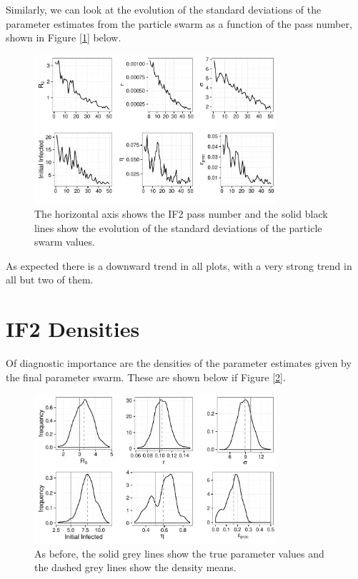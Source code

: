     Similarly, we can look at the evolution of the standard deviations of the parameter estimates from the particle swarm as a function of the pass number, shown in Figure [\ref{if2sdconvergence}] below.

    \begin{figure}
        \centering
        \captionsetup{width=.8\linewidth}
        \includegraphics[width=0.8\textwidth]{./images/if2sdconvergence.pdf}
        \caption{The horizontal axis shows the IF2 pass number and the solid black lines show the evolution of the standard deviations of the particle swarm values. \label{if2sdconvergence}}
    \end{figure}

    As expected there is a downward trend in all plots, with a very strong trend in all but two of them.


\section{IF2 Densities}

	Of diagnostic importance are the densities of the parameter estimates given by the final parameter swarm. These are shown below if Figure [\ref{if2kernels}].

	\begin{figure}
        \centering
        \captionsetup{width=.8\linewidth}
        \includegraphics[width=0.8\textwidth]{./images/if2kernels.pdf}
        \caption{As before, the solid grey lines show the true parameter values and the dashed grey lines show the density means. \label{if2kernels}}
    \end{figure}


